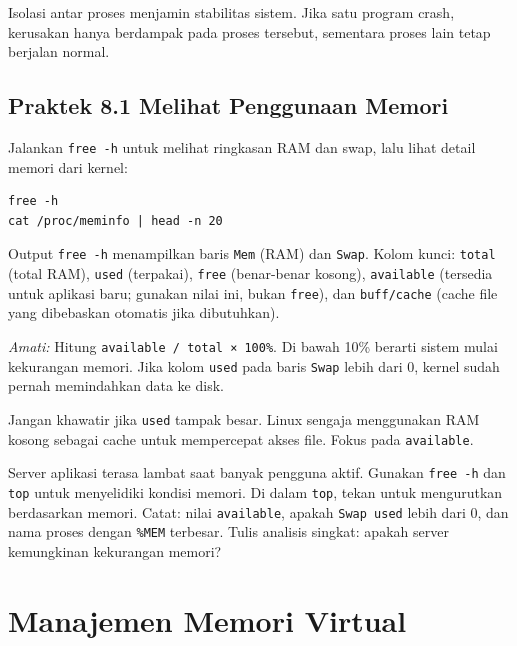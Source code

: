 \begin{notebox}
Isolasi antar proses menjamin stabilitas sistem. Jika satu program crash, kerusakan
hanya berdampak pada proses tersebut, sementara proses lain tetap berjalan normal.
\end{notebox}

\subsection*{Praktek 8.1 Melihat Penggunaan Memori}

Jalankan \texttt{free -h} untuk melihat ringkasan RAM dan swap, lalu lihat detail
memori dari kernel:

\begin{lstlisting}[caption={Ringkasan dan detail memori}]
free -h
cat /proc/meminfo | head -n 20
\end{lstlisting}

Output \texttt{free -h} menampilkan baris \texttt{Mem} (RAM) dan \texttt{Swap}.
Kolom kunci: \texttt{total} (total RAM), \texttt{used} (terpakai), \texttt{free}
(benar-benar kosong), \texttt{available} (tersedia untuk aplikasi baru; gunakan
nilai ini, bukan \texttt{free}), dan \texttt{buff/cache} (cache file yang dibebaskan
otomatis jika dibutuhkan).

\textit{Amati:} Hitung \texttt{available / total × 100\%}. Di bawah 10\% berarti
sistem mulai kekurangan memori. Jika kolom \texttt{used} pada baris \texttt{Swap}
lebih dari 0, kernel sudah pernah memindahkan data ke disk.

\begin{tipbox}
Jangan khawatir jika \texttt{used} tampak besar. Linux sengaja menggunakan RAM
kosong sebagai cache untuk mempercepat akses file. Fokus pada \texttt{available}.
\end{tipbox}

\begin{challengebox}
Server aplikasi terasa lambat saat banyak pengguna aktif. Gunakan \texttt{free -h}
dan \texttt{top} untuk menyelidiki kondisi memori. Di dalam \texttt{top}, tekan
 untuk mengurutkan berdasarkan memori. Catat: nilai \texttt{available},
apakah \texttt{Swap used} lebih dari 0, dan nama proses dengan \texttt{\%MEM}
terbesar. Tulis analisis singkat: apakah server kemungkinan kekurangan memori?
\end{challengebox}

\section{Manajemen Memori Virtual}

